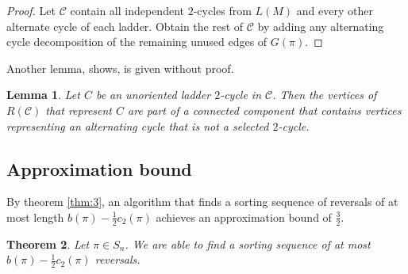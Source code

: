 \documentclass[11pt,DIV=11]{scrartcl}
\newtheorem{theorem}{Theorem}[section]
\newtheorem{lemma}[theorem]{Lemma}
\theoremstyle{definition}
\theoremstyle{remark}
\begin{document}
\begin{proof}
Let $\mathcal{C}$ contain all independent $2$-cycles from $L(M)$ and every other alternate cycle of each ladder. Obtain the rest of $\mathcal{C}$ by adding any alternating cycle decomposition of the remaining unused edges of $G(\pi)$.
\end{proof}

Another lemma, \citeauthor*{Christie1998} shows, is given without proof.

\begin{lemma}
\label{lem:10}
Let $C$ be an unoriented ladder $2$-cycle in $\mathcal{C}$. Then the vertices of $R(\mathcal{C})$ that represent $C$ are part of a connected component that contains vertices representing an alternating cycle that is not a selected $2$-cycle.
\end{lemma}

\subsection{Approximation bound}
\label{sec:approximation_bound}

By theorem \ref{thm:3}, an algorithm that finds a sorting sequence of reversals of at most length $b(\pi) - \frac{1}{2} c_2(\pi)$ achieves an approximation bound of $\frac{3}{2}$.

\begin{theorem}
\label{thm:6}
Let $\pi \in S_n$. We are able to find a sorting sequence of at most $b(\pi) - \frac{1}{2} c_2(\pi)$ reversals.
\end{theorem}
\end{document}
